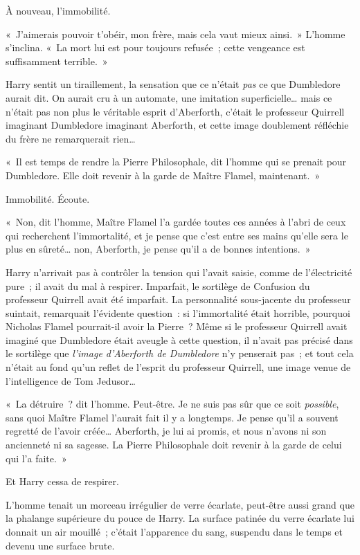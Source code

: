 À nouveau, l'immobilité.

«~J'aimerais pouvoir t'obéir, mon frère, mais cela vaut mieux ainsi.~»
L'homme s'inclina.
«~La mort lui est pour toujours refusée~; cette vengeance est suffisamment terrible.~»

Harry sentit un tiraillement, la sensation que ce n'était \emph{pas} ce que Dumbledore aurait dit.
On aurait cru à un automate, une imitation superficielle… mais ce n'était pas non plus le véritable esprit d'Aberforth, c'était le professeur Quirrell imaginant Dumbledore imaginant Aberforth, et cette image doublement réfléchie du frère ne remarquerait rien…

«~Il est temps de rendre la Pierre Philosophale, dit l'homme qui se prenait pour Dumbledore.
Elle doit revenir à la garde de Maître Flamel, maintenant.~»

Immobilité.
Écoute.

«~Non, dit l'homme, Maître Flamel l'a gardée toutes ces années à l'abri de ceux qui recherchent l'immortalité, et je pense que c'est entre ses mains qu'elle sera le plus en sûreté… non, Aberforth, je pense qu'il a de bonnes intentions.~»

Harry n'arrivait pas à contrôler la tension qui l'avait saisie, comme de l'électricité pure~; il avait du mal à respirer.
Imparfait, le sortilège de Confusion du professeur Quirrell avait été imparfait.
La personnalité sous-jacente du professeur suintait, remarquait l'évidente question~: si l'immortalité était horrible, pourquoi Nicholas Flamel pourrait-il avoir la Pierre~?
Même si le professeur Quirrell avait imaginé que Dumbledore était aveugle à cette question, il n'avait pas précisé dans le sortilège que \emph{l'image d'Aberforth de Dumbledore} n'y penserait pas~; et tout cela n'était au fond qu'un reflet de l'esprit du professeur Quirrell, une image venue de l'intelligence de Tom Jedusor…

«~La détruire~? dit l'homme.
Peut-être.
Je ne suis pas sûr que ce soit \emph{possible}, sans quoi Maître Flamel l'aurait fait il y a longtemps.
Je pense qu'il a souvent regretté de l'avoir créée…
Aberforth, je lui ai promis, et nous n'avons ni son ancienneté ni sa sagesse.
La Pierre Philosophale doit revenir à la garde de celui qui l'a faite.~»

Et Harry cessa de respirer.

L'homme tenait un morceau irrégulier de verre écarlate, peut-être aussi grand que la phalange supérieure du pouce de Harry.
La surface patinée du verre écarlate lui donnait un air mouillé~; c'était l'apparence du sang, suspendu dans le temps et devenu une surface brute.

